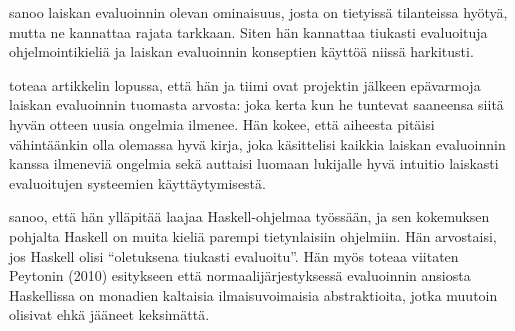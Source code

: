 \citet{vesakarvonen} sanoo laiskan evaluoinnin olevan ominaisuus, josta on tietyissä tilanteissa hyötyä, mutta ne kannattaa rajata tarkkaan. Siten hän kannattaa tiukasti evaluoituja ohjelmointikieliä ja laiskan evaluoinnin konseptien käyttöä niissä harkitusti.

\citet{sampson2009experience} toteaa artikkelin lopussa, että hän ja tiimi ovat projektin jälkeen epävarmoja laiskan evaluoinnin tuomasta arvosta: joka kerta kun he tuntevat saaneensa siitä hyvän otteen uusia ongelmia ilmenee. Hän kokee, että aiheesta pitäisi vähintäänkin olla olemassa hyvä kirja, joka käsittelisi kaikkia laiskan evaluoinnin kanssa ilmeneviä ongelmia sekä auttaisi luomaan lukijalle hyvä intuitio laiskasti evaluoitujen systeemien käyttäytymisestä.

\citet{mohanhackernews} sanoo, että hän ylläpitää laajaa Haskell-ohjelmaa työssään, ja sen kokemuksen pohjalta Haskell on muita kieliä parempi tietynlaisiin ohjelmiin. Hän arvostaisi, jos Haskell olisi ``oletuksena tiukasti evaluoitu''. Hän myös toteaa viitaten Peytonin (2010) esitykseen että normaalijärjestyksessä evaluoinnin ansiosta Haskellissa on monadien kaltaisia ilmaisuvoimaisia abstraktioita, jotka muutoin olisivat ehkä jääneet keksimättä.